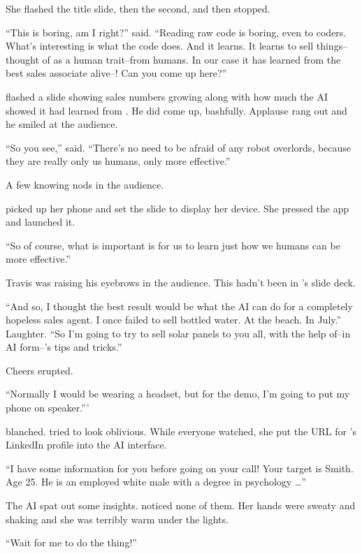 She flashed the title slide, then the second, and then stopped.

``This is boring, am I right?'' {\protag} said. ``Reading raw code is boring, even to coders. What's interesting is what the code does. And it learns. It learns to sell things--thought of as a human trait--from humans. In our case it has learned from the best sales associate alive--\energyJerk{}! Can you come up here?''

{\protag} flashed a slide showing sales numbers growing along with how much the AI showed it had learned from \energyJerk{}. He did come up, bashfully. Applause rang out and he smiled at the audience.

``So you see,'' {\protag} said. ``There's no need to be afraid of any robot overlords, because they are really only us humans, only more effective.''

A few knowing nods in the audience.

{\protag} picked up her phone and set the slide to display her device. She pressed the app and launched it.

``So of course, what is important is for us to learn just how we humans can be more effective.''

Travis was raising his eyebrows in the audience. This hadn't been in {\protag}'s slide deck.

``And so, I thought the best result would be what the AI can do for a completely hopeless sales agent. I once failed to sell bottled water. At the beach. In July.'' Laughter. ``So I'm going to try to sell solar panels to you all, with the help of--in AI form--\energyJerk{}'s tips and tricks.''

Cheers erupted.

``Normally I would be wearing a headset, but for the demo, I'm going to put my phone on speaker.'''

\energyJerk{} blanched. {\protag} tried to look oblivious. While everyone watched, she put the URL for \energyJerk{}'s LinkedIn profile into the AI interface.

``I have some information for you before going on your call! Your target is \energyJerk{} Smith. Age 25. He is an employed white male with a degree in psychology \dots''

The AI spat out some insights. {\protag} noticed none of them. Her hands were sweaty and shaking and she was terribly warm under the lights.

``Wait for me to do the thing!''

